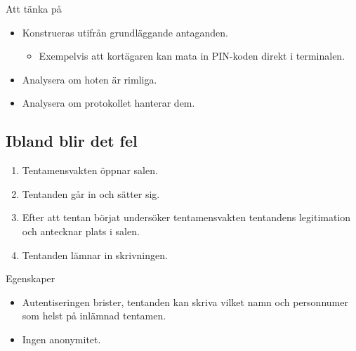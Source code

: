 \begin{frame}
  \begin{alertblock}{Att tänka på}
    \begin{itemize}
      \item Konstrueras utifrån grundläggande antaganden.
        \begin{itemize}
          \item Exempelvis att kortägaren kan mata in PIN-koden direkt 
            i terminalen.
        \end{itemize}
      \item Analysera om hoten är rimliga.
      \item Analysera om protokollet hanterar dem.
    \end{itemize}
  \end{alertblock}
\end{frame}

\subsection{Ibland blir det fel}

\begin{frame}
  \begin{example}
    \begin{enumerate}
      \item Tentamensvakten öppnar salen.
      \item Tentanden går in och sätter sig.
      \item Efter att tentan börjat undersöker tentamensvakten tentandens 
        legitimation och antecknar plats i salen.
      \item Tentanden lämnar in skrivningen.
    \end{enumerate}
  \end{example}

  \pause{}

  \begin{block}{Egenskaper}
    \begin{itemize}
      \item Autentiseringen brister, tentanden kan skriva vilket namn och 
        personnumer som helst på inlämnad tentamen.
      \item Ingen anonymitet.
    \end{itemize}
  \end{block}
\end{frame}

